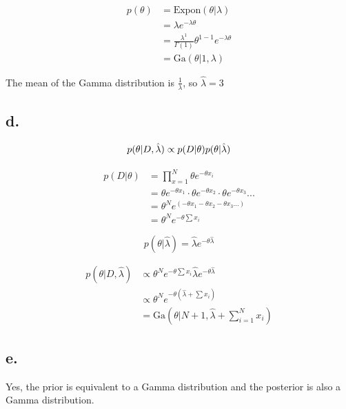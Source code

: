 \documentclass{article}
\begin{document}
\begin{align*}
  p(\theta) &= \text{Expon}(\theta|\lambda) \\
            &= \lambda e^{-\lambda \theta} \\
            &= \frac{\lambda^1}{\Gamma(1)} \theta^{1-1} e^{-\lambda \theta} \\
            &= \text{Ga}(\theta|1, \lambda)
\end{align*}

The mean of the Gamma distribution is $\frac{1}{\lambda}$, so
$\hat{\lambda} = 3$

\subsection{d.}

\begin{equation*}
  p(\theta|D,\hat{\lambda}) \propto p(D|\theta) p(\theta|\hat{\lambda}) \\
\end{equation*}

\begin{align*}
    p(D|\theta) &= \prod_{x=1}^N \theta e^{-\theta x_i} \\
                &= \theta e^{-\theta x_1} \cdot \theta e^{-\theta x_2}
                  \cdot \theta e^{-\theta x_3} ... \\
                &= \theta^N e^{(-\theta x_1 -\theta x_2 -\theta x_3
                  ...)} \\
                &= \theta^N e^{-\theta \sum x_i}
\end{align*}

\begin{equation*}
  p(\theta|\hat{\lambda}) = \hat{\lambda} e^{-\theta \hat{\lambda}}
\end{equation*}

\begin{align*}
  p(\theta|D,\hat{\lambda}) &\propto \theta^N e^{-\theta \sum x_i}
  \hat{\lambda} e^{-\theta \hat{\lambda}} \\
  &\propto \theta^N e^{-\theta(\hat{\lambda} + \sum x_i)} \\
  &= \text{Ga}(\theta|N+1, \hat{\lambda} + \sum_{i=1}^N x_i)
\end{align*}

\subsection{e.}

Yes, the prior is equivalent to a Gamma distribution and the posterior
is also a Gamma distribution.
\end{document}
